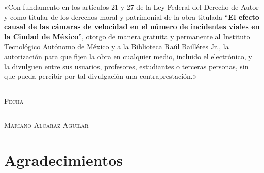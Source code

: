 \documentclass[11pt, oneside]{book}
\begin{document}
\thispagestyle{empty}

\vspace*{\fill}
\begingroup

\noindent
«Con fundamento en los artículos 21 y 27 de la Ley Federal del Derecho de Autor y como titular de los derechos moral y patrimonial de la obra titulada ``\textbf{El efecto causal de las cámaras de velocidad en el número de incidentes viales en la Ciudad de México}'', otorgo de manera gratuita y permanente al Instituto Tecnológico Autónomo de México y a la Biblioteca Raúl Bailléres Jr., la autorización para que fijen la obra en cualquier medio, incluido el electrónico, y la divulguen entre sus usuarios, profesores, estudiantes o terceras personas, sin que pueda percibir por tal divulgación una contraprestación.»


\centering 

\vspace{5em}

\rule[1em]{20em}{0.5pt} %

\textsc{Fecha}
 
\vspace{8em}

\rule[1em]{20em}{0.5pt} %

\textsc{Mariano Alcaraz Aguilar}

\endgroup
\vspace*{\fill}


\pagestyle{plain}
\frontmatter

\chapter*{}
\begin{flushright}
\end{flushright}


\chapter*{Agradecimientos}
\end{document}
